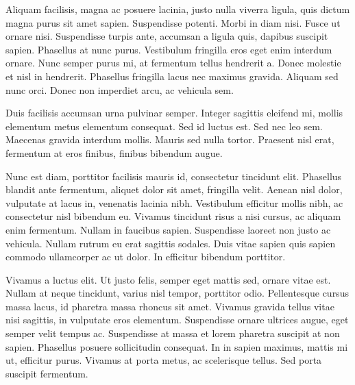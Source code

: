 \documentclass[12pt,a4paper,twoside]{book}
\begin{document}
Aliquam facilisis, magna ac posuere lacinia, justo nulla viverra ligula, quis dictum magna purus sit amet sapien. Suspendisse potenti. Morbi in diam nisi. Fusce ut ornare nisi. Suspendisse turpis ante, accumsan a ligula quis, dapibus suscipit sapien. Phasellus at nunc purus. Vestibulum fringilla eros eget enim interdum ornare. Nunc semper purus mi, at fermentum tellus hendrerit a. Donec molestie et nisl in hendrerit. Phasellus fringilla lacus nec maximus gravida. Aliquam sed nunc orci. Donec non imperdiet arcu, ac vehicula sem.

Duis facilisis accumsan urna pulvinar semper. Integer sagittis eleifend mi, mollis elementum metus elementum consequat. Sed id luctus est. Sed nec leo sem. Maecenas gravida interdum mollis. Mauris sed nulla tortor. Praesent nisl erat, fermentum at eros finibus, finibus bibendum augue.

Nunc est diam, porttitor facilisis mauris id, consectetur tincidunt elit. Phasellus blandit ante fermentum, aliquet dolor sit amet, fringilla velit. Aenean nisl dolor, vulputate at lacus in, venenatis lacinia nibh. Vestibulum efficitur mollis nibh, ac consectetur nisl bibendum eu. Vivamus tincidunt risus a nisi cursus, ac aliquam enim fermentum. Nullam in faucibus sapien. Suspendisse laoreet non justo ac vehicula. Nullam rutrum eu erat sagittis sodales. Duis vitae sapien quis sapien commodo ullamcorper ac ut dolor. In efficitur bibendum porttitor.

Vivamus a luctus elit. Ut justo felis, semper eget mattis sed, ornare vitae est. Nullam at neque tincidunt, varius nisl tempor, porttitor odio. Pellentesque cursus massa lacus, id pharetra massa rhoncus sit amet. Vivamus gravida tellus vitae nisi sagittis, in vulputate eros elementum. Suspendisse ornare ultrices augue, eget semper velit tempus ac. Suspendisse at massa et lorem pharetra suscipit at non sapien. Phasellus posuere sollicitudin consequat. In in sapien maximus, mattis mi ut, efficitur purus. Vivamus at porta metus, ac scelerisque tellus. Sed porta suscipit fermentum.
\end{document}
